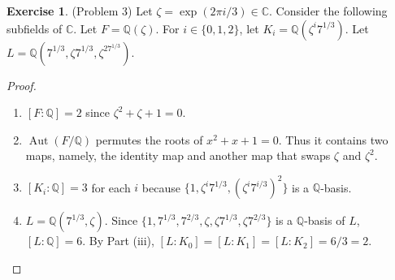 \documentclass[12pt, psamsfonts]{amsart}
\theoremstyle{definition}
\newtheorem*{exer}{Exercise}
\theoremstyle{remark}
\DeclareMathOperator{\Aut}{Aut}
\numberwithin{equation}{section}
\begin{document}
\begin{exer}{(Problem 3)}
  Let $\zeta = \exp(2\pi i / 3) \in \mathbb{C}$.
  Consider the following subfields of $\mathbb{C}$.
  Let $F = \mathbb{Q}(\zeta)$.
  For $i \in \{ 0, 1, 2 \}$, let $K_i = \mathbb{Q}(\zeta^i7^{1/3})$.
  Let $L = \mathbb{Q}(7^{1/3}, \zeta7^{1/3}, \zeta^27^{1/3})$.
\end{exer}

\begin{proof}
  $ $
  \begin{enumerate}
    \item 
      $[F:\mathbb{Q}] = 2$ since $\zeta^2 + \zeta + 1 = 0$.
    \item
      $\Aut(F/\mathbb{Q})$ permutes the roots of $x^2 + x + 1 = 0$.
      Thus it contains two maps, namely, the identity map and another map that swaps $\zeta$ and $\zeta^2$.
    \item
      $[K_i:\mathbb{Q}] = 3$ for each $i$ because $\{ 1, \zeta^i7^{1/3}, (\zeta^{i}7^{i/3})^2 \}$ is a $\mathbb{Q}$-basis.
    \item
      $L = \mathbb{Q}(7^{1/3}, \zeta)$.
      Since $\{ 1, 7^{1/3}, 7^{2/3}, \zeta, \zeta 7^{1/3}, \zeta 7^{2/3} \}$ is a $\mathbb{Q}$-basis of $L$, $[L:\mathbb{Q}] = 6$.
      By Part (iii), $[L:K_0] = [L:K_1] = [L:K_2] = 6 / 3 = 2$.
  \end{enumerate}
\end{proof}
\end{document}
